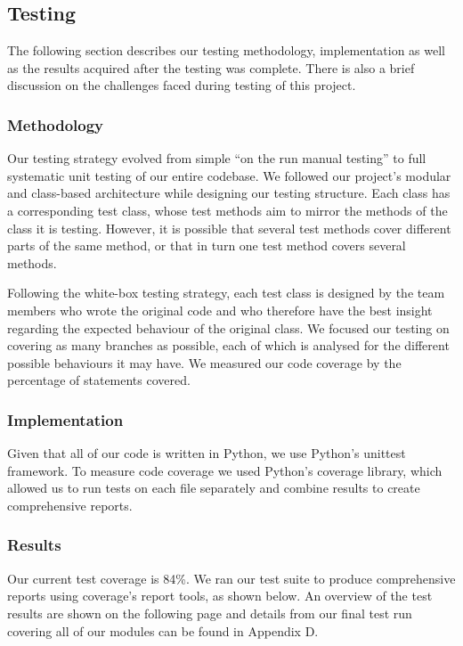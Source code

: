 \documentclass[a4paper,11pt]{article}
\begin{document}
\subsection{Testing}
The following section describes our testing methodology, implementation as well as the results acquired after the testing was complete. There is also a brief discussion on the challenges faced during testing of this project.

\subsubsection{Methodology}
Our testing strategy evolved from simple ``on the run manual testing'' to full systematic unit testing of our entire codebase. We followed our project's modular and class-based architecture while designing our testing structure. Each class has a corresponding test class, whose test methods aim to mirror the methods of the class it is testing. However, it is possible that several test methods cover different parts of the same method, or that in turn one test method covers several methods.

Following the white-box testing strategy, each test class is designed by the team members who wrote the original code and who therefore have the best insight regarding the expected behaviour of the original class. We focused our testing on covering as many branches as possible, each of which is analysed for the different possible behaviours it may have. We measured our code coverage by the percentage of statements covered.

\subsubsection{Implementation}
Given that all of our code is written in Python, we use Python's unittest framework. To measure code coverage we used Python's coverage library, which allowed us to run tests on each file separately and combine results to create comprehensive reports.

\subsubsection{Results}
Our current test coverage is 84\%. We ran our test suite to produce comprehensive reports using coverage's report tools, as shown below. An overview of the test results are shown on the following page and details from our final test run covering all of our modules can be found in Appendix D.
\end{document}

